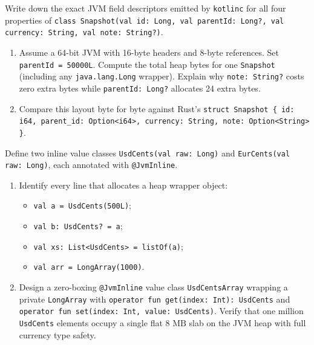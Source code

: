 \begin{exercise}
\label{ex:ch10-null-bytecode}
Write down the exact JVM field descriptors emitted by \texttt{kotlinc} for all four properties of \texttt{class Snapshot(val id: Long, val parentId: Long?, val currency: String, val note: String?)}.
\begin{enumerate}
  \item Assume a 64-bit JVM with 16-byte headers and 8-byte references. Set \texttt{parentId = 50000L}. Compute the total heap bytes for one \texttt{Snapshot} (including any \texttt{java.lang.Long} wrapper). Explain why \texttt{note: String?} costs zero extra bytes while \texttt{parentId: Long?} allocates 24 extra bytes.
  \item Compare this layout byte for byte against Rust's \texttt{struct Snapshot \{ id: i64, parent\_id: Option<i64>, currency: String, note: Option<String> \}}.
\end{enumerate}
\end{exercise}

\begin{exercise}
\label{ex:ch10-value-class-boxing}
Define two inline value classes \texttt{UsdCents(val raw: Long)} and \texttt{EurCents(val raw: Long)}, each annotated with \texttt{@JvmInline}.
\begin{enumerate}
  \item Identify every line that allocates a heap wrapper object:
  \begin{itemize}
    \item[(a)] \texttt{val a = UsdCents(500L)};
    \item[(b)] \texttt{val b: UsdCents? = a};
    \item[(c)] \texttt{val xs: List<UsdCents> = listOf(a)};
    \item[(d)] \texttt{val arr = LongArray(1000)}.
  \end{itemize}
  \item Design a zero-boxing \texttt{@JvmInline} value class \texttt{UsdCentsArray} wrapping a private \texttt{LongArray} with \texttt{operator fun get(index: Int): UsdCents} and \texttt{operator fun set(index: Int, \allowbreak{}value: UsdCents)}. Verify that one million \texttt{UsdCents} elements occupy a single flat $8\text{ MB}$ slab on the JVM heap with full currency type safety.
\end{enumerate}
\end{exercise}

